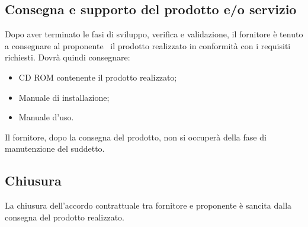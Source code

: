 \documentclass[../NormeDiProgetto.tex]{subfiles}
\begin{document}
		\subsection{Consegna e supporto del prodotto e/o servizio}
			Dopo aver terminato le fasi di sviluppo, verifica e validazione, il fornitore è tenuto a consegnare al proponente \proponente\ il prodotto realizzato in conformità con i requisiti richiesti. Dovrà quindi consegnare:
			\begin{itemize}
				\item CD ROM contenente il prodotto realizzato;
				\item Manuale di installazione;
				\item Manuale d'uso.
			\end{itemize}
			Il fornitore, dopo la consegna del prodotto, non si occuperà della fase di manutenzione del suddetto.
		\subsection{Chiusura}
			La chiusura dell'accordo contrattuale tra fornitore e proponente è sancita dalla consegna del prodotto realizzato.
\end{document}
